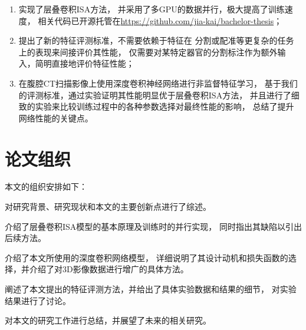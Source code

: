 \begin{enumerate}
    \item 实现了层叠卷积ISA方法\cite{wu2013unsupervised}，
        并采用了多GPU的数据并行，极大提高了训练速度，
        相关代码已开源托管在\url{https://github.com/jia-kai/bachelor-thesis}；
    \item 提出了新的特征评测标准，不需要依赖于特征在
        分割或配准等更复杂的任务上的表现来间接评价其性能，
        仅需要对某特定器官的分割标注作为额外输入，简明直接地评价特征性能；
    \item 在腹腔CT扫描影像上使用深度卷积神经网络进行非监督特征学习，
        基于我们的评测标准，通过实验证明其性能明显优于层叠卷积ISA方法，
        并且进行了细致的实验来比较训练过程中的各种参数选择对最终性能的影响，
        总结了提升网络性能的关键点。
\end{enumerate}

\section{论文组织}
本文的组织安排如下：

对研究背景、研究现状和本文的主要创新点进行了综述。

介绍了层叠卷积ISA模型的基本原理及训练时的并行实现，
同时指出其缺陷以引出后续方法。

介绍了本文所使用的深度卷积网络模型，
详细说明了其设计动机和损失函数的选择，并介绍了对3D影像数据进行增广的具体方法。

阐述了本文提出的特征评测方法，并给出了具体实验数据和结果的细节，
对实验结果进行了讨论。

对本文的研究工作进行总结，并展望了未来的相关研究。

